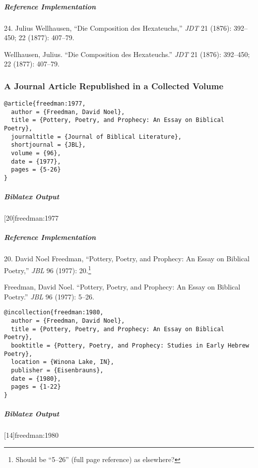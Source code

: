 \documentclass[a4paper]{article}
\newenvironment{biboutput}{%
  \subparagraph{Biblatex Output}
}{\color{black}}
\newenvironment{refimp}{%
  \subparagraph{Reference Implementation}
  \color{reference-colour}
  \rm
}{\par\color{black}}
\begin{document}
\begin{refimp}
  24. Julius Wellhausen, “Die Composition des Hexateuchs,” \emph{JDT} 21
  (1876): 392–450; 22 (1877): 407–79.

  \hangindent\bibindent Wellhausen, Julius. “Die Composition des Hexateuchs.”
  \emph{JDT} 21 (1876): 392–450; 22 (1877): 407–79.

\end{refimp}

\subsubsection{A Journal Article Republished in a Collected Volume}

\begin{lstlisting}
@article{freedman:1977,
  author = {Freedman, David Noel},
  title = {Pottery, Poetry, and Prophecy: An Essay on Biblical Poetry},
  journaltitle = {Journal of Biblical Literature},
  shortjournal = {JBL},
  volume = {96},
  date = {1977},
  pages = {5-26}
}
\end{lstlisting}

\begin{biboutput}
  [20]{freedman:1977}
\end{biboutput}

\begin{refimp}
  20. David Noel Freedman, “Pottery, Poetry, and Prophecy: An Essay on
  Biblical Poetry,” \emph{JBL} 96 (1977): 20.\footnote{Should be “5–26” (full
    page reference) as elsewhere?}

  \hangindent\bibindent Freedman, David Noel. “Pottery, Poetry, and Prophecy:
  An Essay on Biblical Poetry.” \emph{JBL} 96 (1977): 5–26.

\end{refimp}

\begin{lstlisting}
@incollection{freedman:1980,
  author = {Freedman, David Noel},
  title = {Pottery, Poetry, and Prophecy: An Essay on Biblical Poetry},
  booktitle = {Pottery, Poetry, and Prophecy: Studies in Early Hebrew Poetry},
  location = {Winona Lake, IN},
  publisher = {Eisenbrauns},
  date = {1980},
  pages = {1-22}
}
\end{lstlisting}

\begin{biboutput}
  [14]{freedman:1980}
\end{biboutput}
\end{document}
